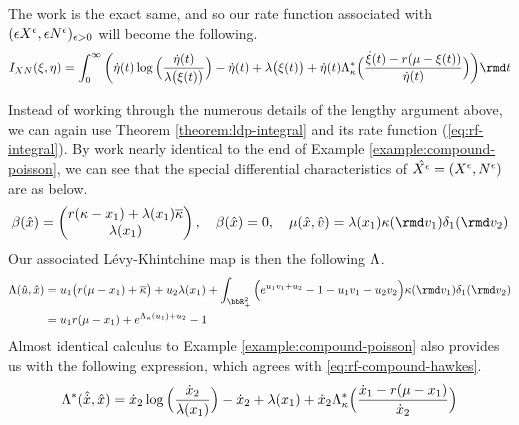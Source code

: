\begin{example}
\begin{enumerate}
      The work is the exact same, and so our rate function associated with $(\epsilon X^\epsilon, \epsilon N^\epsilon)_{\epsilon>0}$ will become the following.
      \begin{equation}
        \label{eq:rf-compound-hawkes}
        \rf_{\X\N}(\pathVar, \eta) = \int_0^\infty \bigg( \dot\eta(t) \log\Big( \frac{\dot\eta(t)}{\affInt\big(\pathVar(t)\big)} \Big) - \dot\eta(t) + \affInt\big(\pathVar(t)\big) + \dot\eta(t) \ode_\affDist^*\Big(\frac{\dot\pathVar(t) - \hawkesRate(\mu-\pathVar(t))}{\dot\eta(t)} \Big) \bigg) \rmd t
      \end{equation}
  \end{enumerate}
  Instead of working through the numerous details of the lengthy argument above, we can again use Theorem \ref{theorem:ldp-integral} and its rate function (\ref{eq:rf-integral}).
  By work nearly identical to the end of Example \ref{example:compound-poisson}, we can see that the special differential characteristics of $\hat{X^\epsilon} = (X^\epsilon, N^\epsilon)$ are as below.
  \begin{equation*}
    \affDrift(\hat\stateVar) = \begin{pmatrix} \hawkesRate(\kappa - \stateVar_1) + \affInt(\stateVar_1)\overline{\affDist} \\ \affInt(\stateVar_1) \end{pmatrix}, \quad
    \affDrift(\hat\stateVar) = 0, \quad
    \affJump(\hat\stateVar, \hat\markVar) = \affInt(\stateVar_1) \affDist(\rmd\markVar_1) \delta_1(\rmd\markVar_2)
  \end{equation*}
  Our associated L\'evy-Khintchine map is then the following $\Lambda$.
  \begin{align*}
    \ode(\hat\momentVar, \hat\stateVar) 
    &= \momentVar_1\big(\hawkesRate(\mu - \stateVar_1) + \overline\affDist\big) + \momentVar_2 \affInt(\stateVar_1) + \int_{\bbR_+^2} \Big( e^{\momentVar_1\markVar_1 + \momentVar_2} - 1 - \momentVar_1\markVar_1 - \momentVar_2\markVar_2 \Big) \affDist(\rmd\markVar_1)\delta_1(\rmd\markVar_2) \\
    &= \momentVar_1 \hawkesRate(\mu-\stateVar_1) + e^{\ode_\affDist(\momentVar_1)+\momentVar_2} - 1
  \end{align*}
  Almost identical calculus to Example \ref{example:compound-poisson} also provides us with the following expression, which agrees with \ref{eq:rf-compound-hawkes}.
  \begin{equation*}
    \Lambda^*(\hat{\dot{x}}, \hat{x}) = \dot{x}_2 \log\Big(\frac{\dot{x}_2}{\lambda(x_1)} \Big) - \dot{x}_2 + \lambda(x_1) + \dot{x}_2 \Lambda_\kappa^*\Big( \frac{\dot{x}_1 - r(\mu - x_1)}{\dot{x}_2} \Big)
  \end{equation*}
\end{example}
